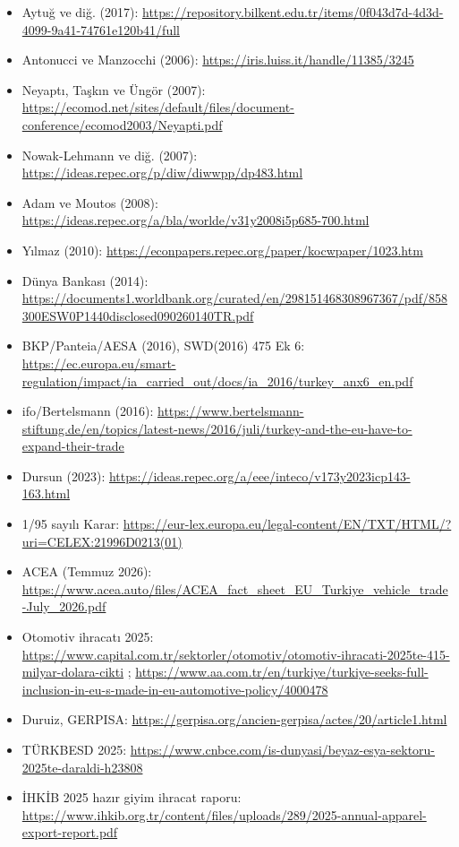 \begin{itemize}
\tightlist
\item
  Aytuğ ve diğ. (2017): \url{https://repository.bilkent.edu.tr/items/0f043d7d-4d3d-4099-9a41-74761e120b41/full}
\item
  Antonucci ve Manzocchi (2006): \url{https://iris.luiss.it/handle/11385/3245}
\item
  Neyaptı, Taşkın ve Üngör (2007): \url{https://ecomod.net/sites/default/files/document-conference/ecomod2003/Neyapti.pdf}
\item
  Nowak-Lehmann ve diğ. (2007): \url{https://ideas.repec.org/p/diw/diwwpp/dp483.html}
\item
  Adam ve Moutos (2008): \url{https://ideas.repec.org/a/bla/worlde/v31y2008i5p685-700.html}
\item
  Yılmaz (2010): \url{https://econpapers.repec.org/paper/kocwpaper/1023.htm}
\item
  Dünya Bankası (2014): \url{https://documents1.worldbank.org/curated/en/298151468308967367/pdf/858300ESW0P1440disclosed090260140TR.pdf}
\item
  BKP/Panteia/AESA (2016), SWD(2016) 475 Ek 6: \url{https://ec.europa.eu/smart-regulation/impact/ia_carried_out/docs/ia_2016/turkey_anx6_en.pdf}
\item
  ifo/Bertelsmann (2016): \url{https://www.bertelsmann-stiftung.de/en/topics/latest-news/2016/juli/turkey-and-the-eu-have-to-expand-their-trade}
\item
  Dursun (2023): \url{https://ideas.repec.org/a/eee/inteco/v173y2023icp143-163.html}
\item
  1/95 sayılı Karar: \url{https://eur-lex.europa.eu/legal-content/EN/TXT/HTML/?uri=CELEX:21996D0213(01)}
\item
  ACEA (Temmuz 2026): \url{https://www.acea.auto/files/ACEA_fact_sheet_EU_Turkiye_vehicle_trade-July_2026.pdf}
\item
  Otomotiv ihracatı 2025: \url{https://www.capital.com.tr/sektorler/otomotiv/otomotiv-ihracati-2025te-415-milyar-dolara-cikti} ; \url{https://www.aa.com.tr/en/turkiye/turkiye-seeks-full-inclusion-in-eu-s-made-in-eu-automotive-policy/4000478}
\item
  Duruiz, GERPISA: \url{https://gerpisa.org/ancien-gerpisa/actes/20/article1.html}
\item
  TÜRKBESD 2025: \url{https://www.cnbce.com/is-dunyasi/beyaz-esya-sektoru-2025te-daraldi-h23808}
\item
  İHKİB 2025 hazır giyim ihracat raporu: \url{https://www.ihkib.org.tr/content/files/uploads/289/2025-annual-apparel-export-report.pdf}

\end{itemize}
